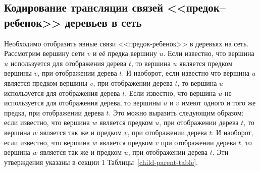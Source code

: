 \FloatBarrier
\subsection{Кодирование трансляции связей <<предок--ребенок>> деревьев в сеть}

Необходимо отобразить явные связи <<предок-ребенок>> в деревьях на сеть.
Рассмотрим вершину сети $v$ и её предка вершину $u$.
Если известно, что вершина $u$ используется для отображения дерева $t$, то вершина $u$ является предком вершины $v$, при отображении дерева $t$.
И наоборот, если известно что вершина $u$ является предком вершины $v$, при отображении дерева $t$, то вершина $u$ используется для отображения дерева $t$.
Если известно, что вершина $u$ не используется для отображения дерева, то вершины $u$ и $v$ имеют одного и того же предка, при отображении дерева $t$.
Это можно выразить следующим образом: если известно, что вершина $w$ является предком $u$, при отображении дерева $t$, то вершина $w$ является так же и предком $v$, при отображении дерева $t$.
И наоборот, если известно, что вершина $w$ является предком $v$ при отображении дерева $t$, то вершина $w$ является так же и предком $u$, при отображении дерева $t$.
Эти утверждения указаны в секции 1 Таблицы~\ref{child-parent-table}.

